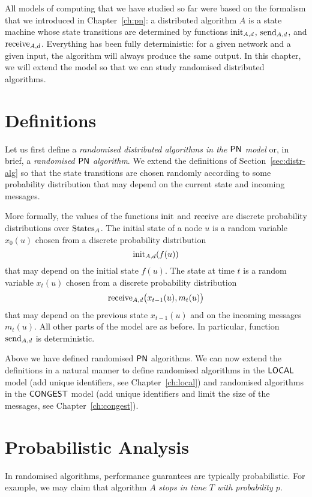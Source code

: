 
All models of computing that we have studied so far were based on the formalism that we introduced in Chapter~\ref{ch:pn}: a distributed algorithm $A$ is a state machine whose state transitions are determined by functions $\operatorname{init}_{A,d}$, $\operatorname{send}_{A,d}$, and $\operatorname{receive}_{A,d}$. Everything has been fully deterministic: for a given network and a given input, the algorithm will always produce the same output. In this chapter, we will extend the model so that we can study randomised distributed algorithms.


\section{Definitions}\label{sec:randomised}

Let us first define a \emph{randomised distributed algorithms in the $\textup{\sffamily PN}$ model} or, in brief, a \emph{randomised $\textup{\sffamily PN}$ algorithm}. We extend the definitions of Section~\ref{sec:distr-alg} so that the state transitions are chosen randomly according to some probability distribution that may depend on the current state and incoming messages.

More formally, the values of the functions $\operatorname{init}$ and $\operatorname{receive}$ are discrete probability distributions over $\operatorname{States}_A$. The initial state of a node $u$ is a random variable $x_0(u)$ chosen from a discrete probability distribution \[\operatorname{init}_{A,d}(f(u))\] that may depend on the initial state $f(u)$. The state at time $t$ is a random variable $x_t(u)$ chosen from a discrete probability distribution \[\operatorname{receive}_{A,d}\bigl(x_{t-1}(u), m_t(u) \bigr)\] that may depend on the previous state $x_{t-1}(u)$ and on the incoming messages $m_t(u)$. All other parts of the model are as before. In particular, function $\operatorname{send}_{A,d}$ is deterministic.

Above we have defined randomised $\textup{\sffamily PN}$ algorithms. We can now extend the definitions in a natural manner to define randomised algorithms in the $\textup{\sffamily LOCAL}$ model (add unique identifiers, see Chapter~\ref{ch:local}) and randomised algorithms in the $\textup{\sffamily CONGEST}$ model (add unique identifiers and limit the size of the messages, see Chapter~\ref{ch:congest}).


\section{Probabilistic Analysis}

In randomised algorithms, performance guarantees are typically probabilistic. For example, we may claim that algorithm $A$ \emph{stops in time $T$ with probability $p$}.


